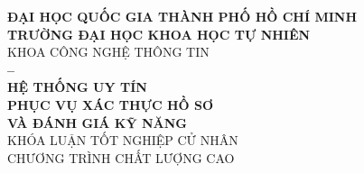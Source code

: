 
\begin{titlepage}
  
  \begin{center}

    {\large \textbf{ĐẠI HỌC QUỐC GIA THÀNH PHỐ HỒ CHÍ MINH}} \\
    \smallskip
    {\large \textbf{TRƯỜNG ĐẠI HỌC KHOA HỌC TỰ NHIÊN}} \\
    \medskip
    KHOA CÔNG NGHỆ THÔNG TIN \\[2.8cm]

    {\Large \bfseries \studentonename{} -- \studenttwoname} \\[3.5cm]

    {\huge \bfseries HỆ THỐNG UY TÍN \\ PHỤC VỤ XÁC THỰC HỒ SƠ \\[3mm] VÀ ĐÁNH GIÁ KỸ NĂNG} \\[3.6cm]

    {\large KHÓA LUẬN TỐT NGHIỆP CỬ NHÂN} \\
    {\large CHƯƠNG TRÌNH CHẤT LƯỢNG CAO} \\

    \vfill
  \end{center}
\end{titlepage}

\restoregeometry